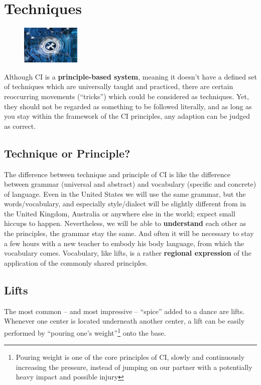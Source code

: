 \chapter{Techniques}\label{ch:techniques}

\begin{figure}
    \centering
    \includegraphics[width=0.25\textwidth]{images/techniques}
\end{figure}

Although CI is a \textbf{principle-based system}, meaning it doesn't have a defined set of techniques which are universally taught and practiced, there are certain reoccurring movements (``tricks'') which could be considered as techniques.
Yet, they should not be regarded as something to be followed literally, and as long as you stay within the framework of the CI principles, any adaption can be judged as correct.

\section{Technique or Principle?}\label{sec:technique-or-principle?}

The difference between technique and principle of CI is like the difference between grammar (universal and abstract) and vocabulary (specific and concrete) of language.
Even in the United States we will use the same grammar, but the words/vocabulary, and especially style/dialect will be slightly different from in the United Kingdom, Australia or anywhere else in the world; expect small hiccups to happen.
Nevertheless, we will be able to \textbf{understand} each other as the principles, the grammar stay the same.
And often it will be necessary to stay a few hours with a new teacher to embody his body language, from which the vocabulary comes.
Vocabulary, like lifts, is a rather \textbf{regional expression} of the application of the commonly shared principles.

\section{Lifts}\label{sec:lifts}

The most common -- and most impressive -- ``spice'' added to a dance are lifts.
Whenever one center is located underneath another center, a lift can be easily performed by ``pouring one's weight''\footnote{Pouring weight is one of the core principles of CI, slowly and continuously increasing the pressure, instead of jumping on our partner with a potentially heavy impact and possible injury} onto the base.

